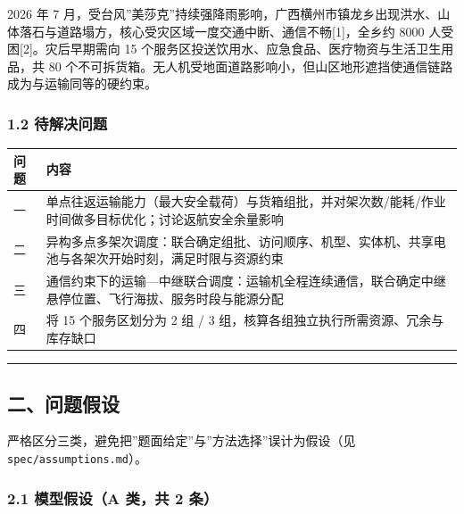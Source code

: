 \documentclass[
  10.5pt,
]{article}
\newcounter{none} %
\begin{document}
2026 年 7
月，受台风''美莎克''持续强降雨影响，广西横州市镇龙乡出现洪水、山体落石与道路塌方，核心受灾区域一度交通中断、通信不畅{[}1{]}，全乡约
8000 人受困{[}2{]}。灾后早期需向 15
个服务区投送饮用水、应急食品、医疗物资与生活卫生用品，共 80
个不可拆货箱。无人机受地面道路影响小，但山区地形遮挡使通信链路成为与运输同等的硬约束。

\subsubsection{1.2 待解决问题}\label{ux5f85ux89e3ux51b3ux95eeux9898}

{\def\LTcaptype{none} %
\begin{longtable}[]{@{}
  >{\raggedright\arraybackslash}p{}
  >{\raggedright\arraybackslash}p{}@{}}
\toprule\noalign{}
\begin{minipage}[b]{\linewidth}\raggedright
问题
\end{minipage} & \begin{minipage}[b]{\linewidth}\raggedright
内容
\end{minipage} \\
\midrule\noalign{}
\endhead
\bottomrule\noalign{}
\endlastfoot
一 &
单点往返运输能力（最大安全载荷）与货箱组批，并对架次数/能耗/作业时间做多目标优化；讨论返航安全余量影响 \\
二 &
异构多点多架次调度：联合确定组批、访问顺序、机型、实体机、共享电池与各架次开始时刻，满足时限与资源约束 \\
三 &
通信约束下的运输---中继联合调度：运输机全程连续通信，联合确定中继悬停位置、飞行海拔、服务时段与能源分配 \\
四 & 将 15 个服务区划分为 2 组 / 3
组，核算各组独立执行所需资源、冗余与库存缺口 \\
\end{longtable}
}

\begin{center}\rule{0.5\linewidth}{0.5pt}\end{center}

\subsection{二、问题假设}\label{ux4e8cux95eeux9898ux5047ux8bbe}

严格区分三类，避免把''题面给定''与''方法选择''误计为假设（见
\texttt{spec/assumptions.md}）。

\subsubsection{2.1 模型假设（A 类，共 2
条）}\label{ux6a21ux578bux5047ux8bbea-ux7c7bux5171-2-ux6761}
\end{document}

